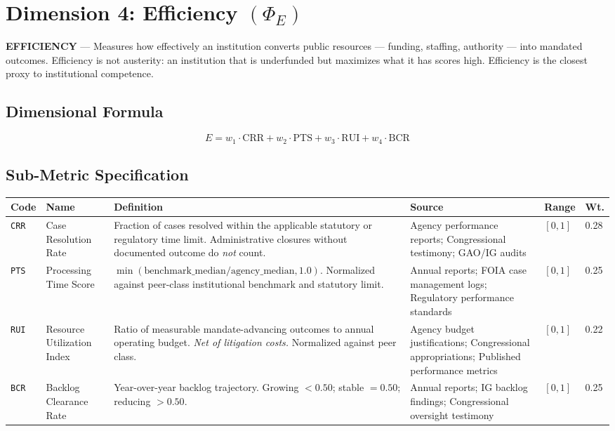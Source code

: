\documentclass[a4paper,11pt]{article}
\begin{document}
	\newpage
	\section{Dimension 4: Efficiency \texorpdfstring{$(\Phi_E)$}{}}
	
	\begin{dimensionbox}
		\textbf{\sffamily EFFICIENCY} — Measures how effectively an institution converts public resources — funding, staffing, authority — into mandated outcomes. Efficiency is not austerity: an institution that is underfunded but maximizes what it has scores high. Efficiency is the closest proxy to institutional competence.
	\end{dimensionbox}
	
	\subsection{Dimensional Formula}
	
	\[
	E = w_1 \cdot \text{CRR} + w_2 \cdot \text{PTS} + w_3 \cdot \text{RUI} + w_4 \cdot \text{BCR}
	\]
	
	\subsection{Sub-Metric Specification}
	
	\begin{longtable}{L{1.1cm} L{1.9cm} L{4.5cm} L{3.5cm} C{1.1cm} C{1.1cm}}
		\toprule
		\color{white}\textbf{\sffamily Code} & \color{white}\textbf{\sffamily Name} & \color{white}\textbf{\sffamily Definition} & \color{white}\textbf{\sffamily Source} & \color{white}\textbf{\sffamily Range} & \color{white}\textbf{\sffamily Wt.} \\
		\midrule
		\endhead
		\texttt{CRR} & Case Resolution Rate & Fraction of cases resolved within the applicable statutory or regulatory time limit. Administrative closures without documented outcome do \emph{not} count. & Agency performance reports; Congressional testimony; GAO/IG audits & $[0,1]$ & 0.28 \\
		\midrule
		\texttt{PTS} & Processing Time Score & $\min(\text{benchmark\_median}/\text{agency\_median}, 1.0)$. Normalized against peer-class institutional benchmark and statutory limit. & Annual reports; FOIA case management logs; Regulatory performance standards & $[0,1]$ & 0.25 \\
		\midrule
		\texttt{RUI} & Resource Utilization Index & Ratio of measurable mandate-advancing outcomes to annual operating budget. \textit{Net of litigation costs.} Normalized against peer class. & Agency budget justifications; Congressional appropriations; Published performance metrics & $[0,1]$ & 0.22 \\
		\midrule
		\texttt{BCR} & Backlog Clearance Rate & Year-over-year backlog trajectory. Growing $< 0.50$; stable $= 0.50$; reducing $> 0.50$. & Annual reports; IG backlog findings; Congressional oversight testimony & $[0,1]$ & 0.25 \\
		\bottomrule
	\end{longtable}
	
\end{document}
